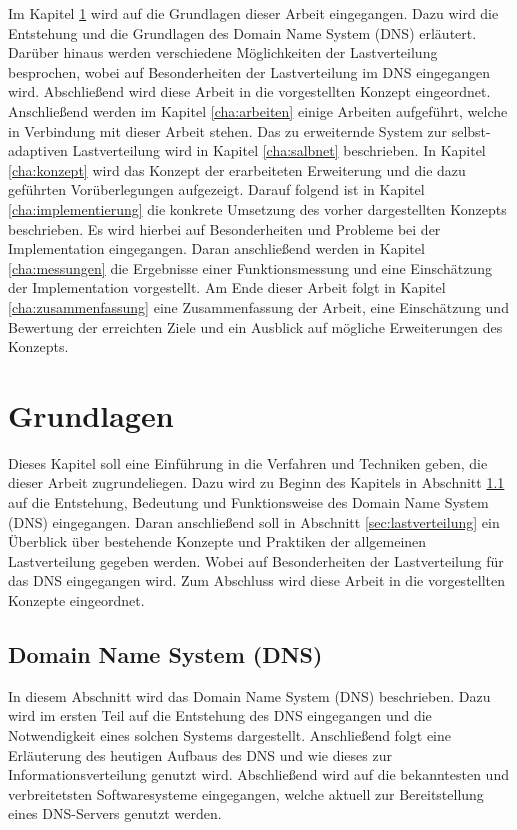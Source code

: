 \documentclass[a4paper, 12pt, BCOR10mm, DIV12, toc=bibliography, toc=listof, german]{scrbook}
\def \dns {Domain Name System (DNS)}
\begin{document}
		Im Kapitel \ref{cha:grundlagen} wird auf die Grundlagen dieser Arbeit eingegangen. Dazu wird die
		Entstehung und die Grundlagen des \dns{} erläutert. Darüber hinaus werden verschiedene
		Möglichkeiten der Lastverteilung besprochen, wobei auf Besonderheiten der Lastverteilung im DNS
		eingegangen wird. Abschließend wird diese Arbeit in die vorgestellten Konzept eingeordnet.
		Anschließend werden im Kapitel \ref{cha:arbeiten} einige Arbeiten aufgeführt, welche in
		Verbindung mit dieser Arbeit stehen. Das zu erweiternde System zur selbst-adaptiven
		Lastverteilung wird in Kapitel \ref{cha:salbnet} beschrieben. In Kapitel \ref{cha:konzept} wird
		das Konzept der erarbeiteten Erweiterung und die dazu geführten Vorüberlegungen aufgezeigt.
		Darauf folgend ist in Kapitel \ref{cha:implementierung} die konkrete Umsetzung des vorher
		dargestellten Konzepts beschrieben. Es wird hierbei auf Besonderheiten und Probleme bei der
		Implementation eingegangen.  Daran anschließend werden in Kapitel \ref{cha:messungen} die
		Ergebnisse einer Funktionsmessung und eine Einschätzung der Implementation vorgestellt. Am Ende
		dieser Arbeit folgt in Kapitel \ref{cha:zusammenfassung} eine Zusammenfassung der Arbeit, eine
		Einschätzung und Bewertung der erreichten Ziele und ein Ausblick auf mögliche Erweiterungen des
		Konzepts.


	\chapter{Grundlagen} %
	\label{cha:grundlagen}

		Dieses Kapitel soll eine Einführung in die Verfahren und Techniken geben, die dieser Arbeit
		zugrundeliegen.  Dazu wird zu Beginn des Kapitels in Abschnitt \ref{sec:dns} auf die Entstehung,
		Bedeutung und Funktionsweise des \dns{} eingegangen. Daran anschließend soll in Abschnitt
		\ref{sec:lastverteilung} ein Überblick über bestehende Konzepte und Praktiken der allgemeinen
		Lastverteilung gegeben werden. Wobei auf Besonderheiten der Lastverteilung für das DNS
		eingegangen wird. Zum Abschluss wird diese Arbeit in die vorgestellten Konzepte eingeordnet. 

		\section{Domain Name System (DNS)} %
		\label{sec:dns}

		In diesem Abschnitt wird das \dns{} \cite{rfc1034,rfc1035} beschrieben. Dazu wird im ersten Teil
		auf die Entstehung des DNS eingegangen und die Notwendigkeit eines solchen Systems dargestellt.
		Anschließend folgt eine Erläuterung des heutigen Aufbaus des DNS und wie dieses zur
		Informationsverteilung genutzt wird.  Abschließend wird auf die bekanntesten und verbreitetsten
		Softwaresysteme eingegangen, welche aktuell zur Bereitstellung eines DNS-Servers genutzt werden.
\end{document}
